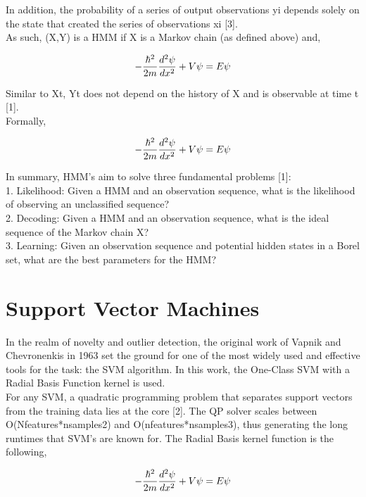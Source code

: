 \documentclass[]{hdsr}
\begin{document}
In addition, the probability of a series of output observations yi depends solely on the state that created the series of observations xi [3].
\\
As such, (X,Y) is a HMM if X is a Markov chain (as defined above) and,

\begin{equation}
-\frac{\hbar^2}{2m} \frac{d^2 \psi}{dx^2} + V\psi = E\psi\\
\end{equation}

Similar to Xt, Yt does not depend on the history of X and is observable at time t [1].\\
Formally,

\begin{equation}
-\frac{\hbar^2}{2m} \frac{d^2 \psi}{dx^2} + V\psi = E\psi\\
\end{equation}

In summary, HMM’s aim to solve three fundamental problems [1]:\\
1.	Likelihood: Given a HMM and an observation sequence, what is the likelihood of observing an unclassified sequence?\\
2.	Decoding: Given a HMM and an observation sequence, what is the ideal sequence of the Markov chain X?\\
3.	Learning: Given an observation sequence and potential hidden states in a Borel set, what are the best parameters for the HMM?\\

\section{Support Vector Machines}
\label{sec3}
In the realm of novelty and outlier detection, the original work of Vapnik and Chevronenkis in 1963 set the ground for one of the most widely used and effective tools for the task: the SVM algorithm. In this work, the One-Class SVM with a Radial Basis Function kernel is used.\\

For any SVM, a quadratic programming problem that separates support vectors from the training data lies at the core [2]. The QP solver scales between O(Nfeatures*nsamples2)  and O(nfeatures*nsamples3), thus generating the long runtimes that SVM’s are known for. The Radial Basis kernel function is the following,

\begin{equation}
-\frac{\hbar^2}{2m} \frac{d^2 \psi}{dx^2} + V\psi = E\psi\\
\end{equation}
\end{document}
